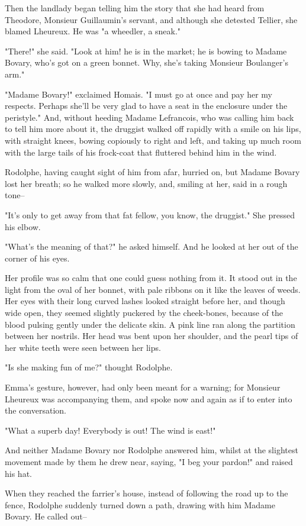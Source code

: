 \documentclass[11pt,twocolumn]{ltugboat}
\begin{document}
Then the landlady began telling him the story that she had heard from
Theodore, Monsieur Guillaumin's servant, and although she detested
Tellier, she blamed Lheureux. He was "a wheedler, a sneak."

"There!" she said. "Look at him! he is in the market; he is bowing to
Madame Bovary, who's got on a green bonnet. Why, she's taking Monsieur
Boulanger's arm."

"Madame Bovary!" exclaimed Homais. "I must go at once and pay her my
respects. Perhaps she'll be very glad to have a seat in the enclosure
under the peristyle." And, without heeding Madame Lefrancois, who was
calling him back to tell him more about it, the druggist walked off
rapidly with a smile on his lips, with straight knees, bowing copiously
to right and left, and taking up much room with the large tails of his
frock-coat that fluttered behind him in the wind.

Rodolphe, having caught sight of him from afar, hurried on, but Madame
Bovary lost her breath; so he walked more slowly, and, smiling at her,
said in a rough tone--

"It's only to get away from that fat fellow, you know, the druggist."
She pressed his elbow.

"What's the meaning of that?" he asked himself. And he looked at her out
of the corner of his eyes.

Her profile was so calm that one could guess nothing from it. It stood
out in the light from the oval of her bonnet, with pale ribbons on it
like the leaves of weeds. Her eyes with their long curved lashes looked
straight before her, and though wide open, they seemed slightly puckered
by the cheek-bones, because of the blood pulsing gently under the
delicate skin. A pink line ran along the partition between her nostrils.
Her head was bent upon her shoulder, and the pearl tips of her white
teeth were seen between her lips.

"Is she making fun of me?" thought Rodolphe.

Emma's gesture, however, had only been meant for a warning; for Monsieur
Lheureux was accompanying them, and spoke now and again as if to enter
into the conversation.

"What a superb day! Everybody is out! The wind is east!"

And neither Madame Bovary nor Rodolphe answered him, whilst at the
slightest movement made by them he drew near, saying, "I beg your
pardon!" and raised his hat.

When they reached the farrier's house, instead of following the road
up to the fence, Rodolphe suddenly turned down a path, drawing with him
Madame Bovary. He called out--
\end{document}
